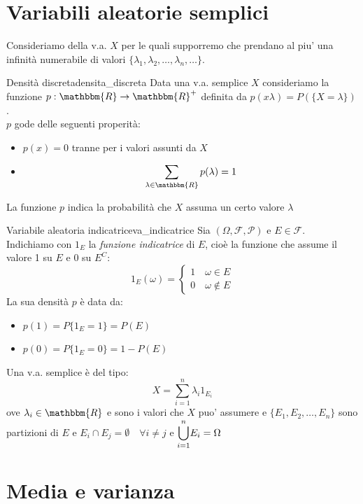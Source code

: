 \documentclass[12pt]{report}
\newcounter{definition}
\newcommand{\nmu}{}
\begin{document}
 	\section{Variabili aleatorie semplici}
 	Consideriamo della v.a. $X$ per le quali supporremo che prendano al piu' una infinità numerabile di valori $\{\lambda_1, \lambda_2, \dots, \lambda_n, \dots\}$. \\
 	\begin{definition}{\nmu Densità discreta}{densita_discreta}
 		Data una v.a. semplice $X$ consideriamo la funzione $p: \mathbbm{R} \to \mathbbm{R}^+$ definita da $p(x\lambda) = P(\{X = \lambda\})$. \\
 		$p$ gode delle seguenti properità:
 		\begin{itemize}
 			\item $p(x) = 0$ tranne per i valori assunti da $X$
 			\item \[
 				\sum_{\lambda \in \mathbbm{R}}p(\lambda) = 1
 			\]
 		\end{itemize}
 		La funzione $p$ indica la probabilità che $X$ assuma un certo valore $\lambda$
  	\end{definition}
 	\begin{example}{\nmu Variabile aleatoria indicatrice}{va_indicatrice}
 		Sia $(\Omega, \mathcal{F}, \mathcal{P})$ e $E \in \mathcal{F}$. \\
 	 	Indichiamo con $1_E$ la \textit{funzione indicatrice} di $E$, cioè la funzione che assume il valore 1 su $E$ e 0 su $E^C$:
 		\[1_E(\omega) = \begin{cases}
 			1 \quad \omega \in E \\
 			0 \quad \omega \notin E
 		\end{cases}\]
 		La sua densità $p$ è data da:
 		\begin{itemize}
 			\item $p(1) = P\{1_E = 1\} = P(E)$
 			\item $p(0) = P\{1_E = 0\} = 1 - P(E)$
 		\end{itemize}
 	\end{example}
 	Una v.a. semplice è del tipo:
 	\[
 	X = \sum_{i=1}^{n}\lambda_i 1_{E_i}
 	\]
 	ove $\lambda_i \in \mathbbm{R}$ e sono i valori che $X$ puo' assumere e $\{E_1, E_2, \dots, E_n\}$ sono partizioni di $E$ e $ E_i \cap E_j = \emptyset \quad \forall i \neq j$ e $\mathlarger{\bigcup_{i=1}^{n}}E_i = \Omega$ \\
 	\section{Media e varianza}
\end{document}
